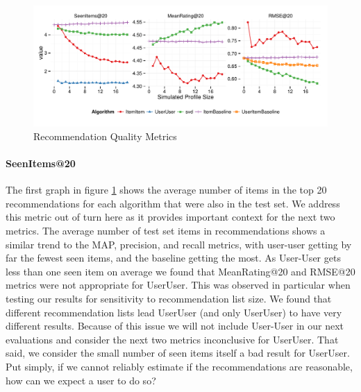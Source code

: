 \documentclass[letterpaper]{sig-alternate}
\begin{document}

\begin{figure}[ht!]
  \centering
  \includegraphics[width=\linewidth]{../lenskit/output/ekstrandTuned20/rmse_20.pdf}
  \caption{Recommendation Quality Metrics}
  \label{fig:topN.rmse}
\end{figure}

  \paragraph{SeenItems@20}
  The first graph in figure \ref{fig:topN.rmse} shows the average number of items in the top 20 recommendations for each algorithm that were also in the test set.
  We address this metric out of turn here as it provides important context for the next two metrics.
  The average number of test set items in recommendations shows a similar trend to the MAP, precision, and recall metrics, with user-user getting by far the fewest seen items, and the baseline getting the most.
  As User-User gets less than one seen item on average we found that MeanRating@20 and RMSE@20 metrics were not appropriate for UserUser.
  This was observed in particular when testing our results for sensitivity to recommendation list size.
  We found that different recommendation lists lead UserUser (and only UserUser) to have very different results.
  Because of this issue we will not include User-User in our next evaluations and consider the next two metrics inconclusive for UserUser.
  That said, we consider the small number of seen items itself a bad result for UserUser.
  Put simply, if we cannot reliably estimate if the recommendations are reasonable, how can we expect a user to do so?
\end{document}
